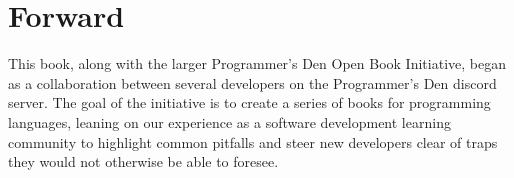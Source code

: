 \documentclass[../main.tex]{subfiles}
\begin{document}
\chapter*{Forward}
This book, along with the larger Programmer's Den Open Book Initiative,
began as a collaboration between several developers on the Programmer's Den
discord server. The goal of the initiative is to create a series of books for
programming languages, leaning on our experience as a software development
learning community to highlight common pitfalls and steer new developers
clear of traps they would not otherwise be able to foresee.

\end{document}
